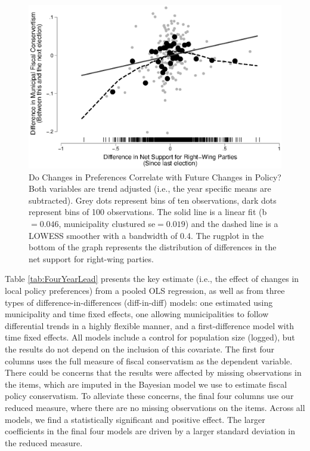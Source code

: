 \documentclass[a4paper,12pt]{article}
\begin{document}
\begin{figure}[h]
	\centering
	\includegraphics[scale = 0.8]{scatterplot.eps}
	\caption{Do Changes in Preferences Correlate with Future Changes in Policy? Both variables are trend adjusted (i.e., the year specific means are subtracted). Grey dots represent bins of ten observations, dark dots represent bins of 100  observations. The solid line is a linear fit (b$=0.046$, municipality clustured se$=0.019$) and the dashed line is a LOWESS smoother with a bandwidth of 0.4. The rugplot in the bottom of the graph represents the distribution of differences in the net support for right-wing parties. }
	\label{fig:scatter}
\end{figure}




Table \ref{tab:FourYearLead} presents the key estimate (i.e., the effect of changes in local policy preferences) from a pooled OLS regression, as well as from three types of difference-in-differences (diff-in-diff) models: one estimated using municipality and time fixed effects, one allowing municipalities to follow differential trends in a highly flexible manner, and a first-difference model with time fixed effects. All models include a control for population size (logged), but the results do not depend on the inclusion of this covariate.  The  first four columns uses the full measure of fiscal conservatism as the dependent variable. There could be concerns that the results were affected by missing observations in the items, which are imputed in the Bayesian model we use to estimate fiscal policy conservatism. To alleviate these concerns, the final four columns use our reduced measure, where there are no missing observations on the items. Across all models, we find a statistically significant and positive effect. The larger coefficients in the final four models are driven by a larger standard deviation in the reduced measure.
\end{document}
